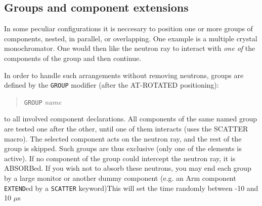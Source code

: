 \subsection{Groups and component extensions}
\label{s:instrdefs-extend-group}

In some peculiar configurations it is neccesary to position one or
more groups of components, nested, in parallel, or overlapping. One
example is a multiple crystal monochromator. One would then like the
neutron ray to interact with \emph{one of} the components of the group
and then continue.

In order to handle such arrangements without removing neutrons, groups are defined by the \texttt{GROUP} modifier (after the AT-ROTATED positioning):
\begin{quote}
  \texttt{GROUP} \textit{name}
\end{quote}
to all involved component declarations. 
All components of the same named group are tested one after the other,
until one of them interacts (uses the SCATTER
macro). The selected component acts on
the neutron ray, and the rest of the group is skipped. Such groups are thus exclusive (only one of the elements is active).
If no component of the group could intercept the neutron ray, it is
ABSORBed. If you wish not to absorb these neutrons, you may end each
group by a large monitor or another dummy component (e.g. an Arm
component \verb+EXTEND+ed by a \verb+SCATTER+ keyword)This will set the time randomly between -10 and 10 $\mu$s


